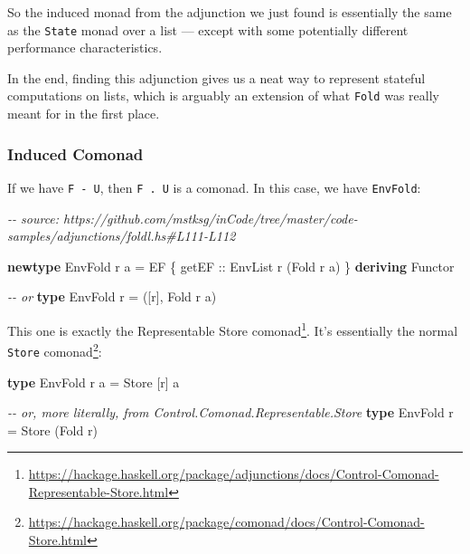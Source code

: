 \documentclass[]{article}
\newenvironment{Shaded}{}{}
\newcommand{\CommentTok}[1]{\textcolor[rgb]{0.38,0.63,0.69}{\textit{#1}}}
\newcommand{\DataTypeTok}[1]{\textcolor[rgb]{0.56,0.13,0.00}{#1}}
\newcommand{\KeywordTok}[1]{\textcolor[rgb]{0.00,0.44,0.13}{\textbf{#1}}}
\newcommand{\NormalTok}[1]{#1}
\newcommand{\OtherTok}[1]{\textcolor[rgb]{0.00,0.44,0.13}{#1}}
\renewcommand{\href}[2]{#2\footnote{\url{#1}}}
\begin{document}
So the induced monad from the adjunction we just found is essentially the same
as the \texttt{State} monad over a list --- except with some potentially
different performance characteristics.

In the end, finding this adjunction gives us a neat way to represent stateful
computations on lists, which is arguably an extension of what \texttt{Fold} was
really meant for in the first place.

\hypertarget{induced-comonad}{%
\subsubsection{Induced Comonad}\label{induced-comonad}}

If we have \texttt{F\ -\textbar{}\ U}, then \texttt{F\ .\ U} is a comonad. In
this case, we have \texttt{EnvFold}:

\begin{Shaded}
\begin{Highlighting}[]
\CommentTok{{-}{-} source: https://github.com/mstksg/inCode/tree/master/code{-}samples/adjunctions/foldl.hs\#L111{-}L112}

\KeywordTok{newtype} \DataTypeTok{EnvFold}\NormalTok{ r a }\OtherTok{=} \DataTypeTok{EF}\NormalTok{ \{}\OtherTok{ getEF ::} \DataTypeTok{EnvList}\NormalTok{ r (}\DataTypeTok{Fold}\NormalTok{ r a) \}}
  \KeywordTok{deriving} \DataTypeTok{Functor}

\CommentTok{{-}{-} or}
\KeywordTok{type} \DataTypeTok{EnvFold}\NormalTok{ r }\OtherTok{=}\NormalTok{ ([r], }\DataTypeTok{Fold}\NormalTok{ r a)}
\end{Highlighting}
\end{Shaded}

This one is exactly the
\href{https://hackage.haskell.org/package/adjunctions/docs/Control-Comonad-Representable-Store.html}{Representable
Store comonad}. It's essentially the normal
\href{https://hackage.haskell.org/package/comonad/docs/Control-Comonad-Store.html}{\texttt{Store}
comonad}:

\begin{Shaded}
\begin{Highlighting}[]
\KeywordTok{type} \DataTypeTok{EnvFold}\NormalTok{ r a }\OtherTok{=} \DataTypeTok{Store}\NormalTok{ [r] a}

\CommentTok{{-}{-} or, more literally, from Control.Comonad.Representable.Store}
\KeywordTok{type} \DataTypeTok{EnvFold}\NormalTok{ r }\OtherTok{=} \DataTypeTok{Store}\NormalTok{ (}\DataTypeTok{Fold}\NormalTok{ r)}
\end{Highlighting}
\end{Shaded}
\end{document}

